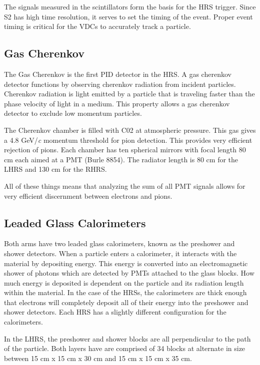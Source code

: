 The signals measured in the scintillators form the basis for the HRS trigger. Since S2 has high time resolution, it serves to set the timing of the event. Proper event timing is critical for the VDCs to accurately track a particle.

\subsection{Gas Cherenkov}

The Gas Cherenkov is the first PID detector in the HRS. A gas cherenkov detector functions by observing cherenkov radiation from incident particles. Cherenkov radiation is light emitted by a particle that is traveling faster than the phase velocity of light in a medium. This property allows a gas cherenkov detector to exclude low momentum particles.

The Cherenkov chamber is filled with C02 at atmospheric pressure. This gas gives a 4.8 GeV/\textit{c}  momentum threshold for pion detection. This provides very efficient rejection of pions. Each chamber has ten spherical mirrors with focal length 80 cm each aimed at a PMT (Burle 8854). The radiator length is 80 cm for the LHRS and 130 cm for the RHRS.

All of these things means that analyzing the sum of all PMT signals allows for very efficient discernment between electrons and pions.

\subsection{Leaded Glass Calorimeters}

Both arms have two leaded glass calorimeters, known as the preshower and shower detectors. When a particle enters a calorimeter, it interacts with the material by depositing energy. This energy is converted into an electromagnetic shower of photons which are detected by PMTs attached to the glass blocks. How much energy is deposited is dependent on the particle and its radiation length within the material. In the case of the HRSs, the calorimeters are thick enough that electrons will completely deposit all of their energy into the preshower and shower detectors. Each HRS has a slightly different configuration for the calorimeters.

In the LHRS, the preshower and shower blocks are all perpendicular to the path of the particle. Both layers have are comprised of 34 blocks at alternate in size between 15 cm x 15 cm x 30 cm and 15 cm x 15 cm x 35 cm.

